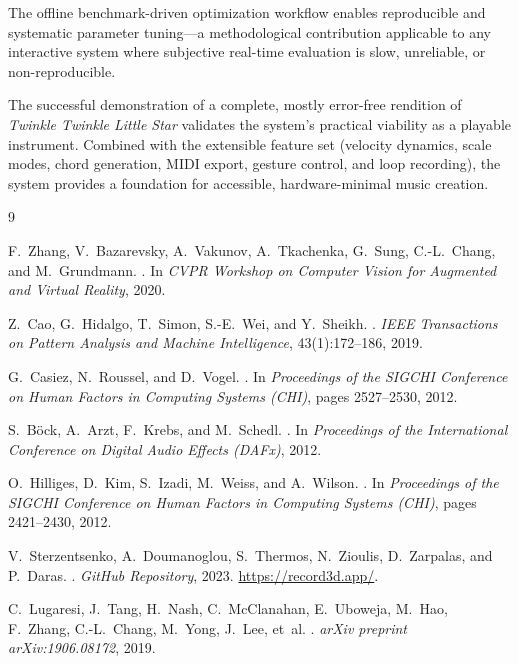 \documentclass[11pt,a4paper]{article}
\begin{document}
The offline benchmark-driven optimization workflow enables reproducible and systematic parameter tuning---a methodological contribution applicable to any interactive system where subjective real-time evaluation is slow, unreliable, or non-reproducible.

The successful demonstration of a complete, mostly error-free rendition of \textit{Twinkle Twinkle Little Star} validates the system's practical viability as a playable instrument.
Combined with the extensible feature set (velocity dynamics, scale modes, chord generation, MIDI export, gesture control, and loop recording), the system provides a foundation for accessible, hardware-minimal music creation.


\begin{thebibliography}{9}

F.~Zhang, V.~Bazarevsky, A.~Vakunov, A.~Tkachenka, G.~Sung, C.-L.~Chang, and M.~Grundmann.
.
\newblock In \emph{CVPR Workshop on Computer Vision for Augmented and Virtual Reality}, 2020.

Z.~Cao, G.~Hidalgo, T.~Simon, S.-E.~Wei, and Y.~Sheikh.
.
\newblock \emph{IEEE Transactions on Pattern Analysis and Machine Intelligence}, 43(1):172--186, 2019.

G.~Casiez, N.~Roussel, and D.~Vogel.
.
\newblock In \emph{Proceedings of the SIGCHI Conference on Human Factors in Computing Systems (CHI)}, pages 2527--2530, 2012.

S.~B{\"o}ck, A.~Arzt, F.~Krebs, and M.~Schedl.
.
\newblock In \emph{Proceedings of the International Conference on Digital Audio Effects (DAFx)}, 2012.

O.~Hilliges, D.~Kim, S.~Izadi, M.~Weiss, and A.~Wilson.
.
\newblock In \emph{Proceedings of the SIGCHI Conference on Human Factors in Computing Systems (CHI)}, pages 2421--2430, 2012.

V.~Sterzentsenko, A.~Doumanoglou, S.~Thermos, N.~Zioulis, D.~Zarpalas, and P.~Daras.
.
\newblock \emph{GitHub Repository}, 2023.
\newblock \url{https://record3d.app/}.

C.~Lugaresi, J.~Tang, H.~Nash, C.~McClanahan, E.~Uboweja, M.~Hao, F.~Zhang, C.-L.~Chang, M.~Yong, J.~Lee, et~al.
.
\newblock \emph{arXiv preprint arXiv:1906.08172}, 2019.

\end{thebibliography}
\end{document}
